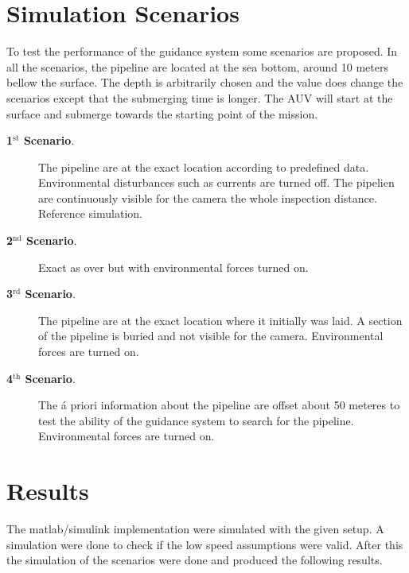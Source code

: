 \section{Simulation Scenarios}
	To test the performance of the guidance system some scenarios are proposed. In all the scenarios, the
	pipeline are located at the sea bottom, around 10 meters bellow the surface. The depth is arbitrarily
	chosen and the value does change the scenarios except that the submerging time is longer. The AUV 
	will start at the surface and submerge towards the starting point of the mission. 
	\begin{description}
		\item[\textbf{1$^{\mathrm{st}}$ Scenario}.] The pipeline are at the exact location according 
		to predefined data. Environmental disturbances such as currents are turned off. The pipelien are
		continuously visible for the camera the whole inspection distance. Reference simulation.
		\item[\textbf{2$^{\mathrm{nd}}$ Scenario}.] Exact as over but with environmental forces turned on.
		\item[\textbf{3$^{\mathrm{rd}}$ Scenario}.] The pipeline are at the exact location where 
		it initially was laid. A section of the pipeline is buried and not visible for the camera.
		Environmental forces are turned on.
		\item[\textbf{4$^{\mathrm{th}}$ Scenario}.] The \'a priori information about the pipeline 
		are offset about 50 meteres to test the ability of the guidance system to search for the pipeline.
		Environmental forces are turned on.
	\end{description}


\section{Results}
	The matlab/simulink implementation were simulated with the given setup. A simulation were done to
	check if the low speed assumptions were valid. After this the simulation of the scenarios were done
	and produced the following results.


